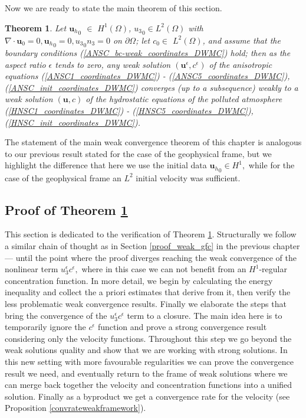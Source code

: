\documentclass[12pt]{report}
\newtheorem{theorem}{Theorem}
\numberwithin{theorem}{chapter}
\numberwithin{corollary}{chapter}
\numberwithin{lemma}{chapter}
\numberwithin{remark}{chapter}
\numberwithin{definition}{chapter}
\numberwithin{prop}{chapter}
\begin{document}
Now we are ready to state the main theorem of this section.

\begin{theorem} \label{maintheoremWEAK}
Let ${\mathbf{u}_h}_0$ $\in$ $H^1 (\Omega)$, ${u_3}_0 \in L^2(\Omega)$ with $\nabla \cdot \mathbf{u}_0 = 0, {\mathbf{u}_h}_0 = 0, {u_3}_0 n_3 = 0$ on $\partial \Omega$; let $c_0 \in$ $L^2 (\Omega)$, and assume that the boundary conditions (\ref{ANSC_bc-weak_coordinates_DWMC}) hold; then as the aspect ratio $\epsilon$ tends to zero, any weak solution $(\mathbf{u}^\epsilon, c^\epsilon)$ of the anisotropic equations (\ref{ANSC1_coordinates_DWMC}) - (\ref{ANSC5_coordinates_DWMC}), (\ref{ANSC_init_coordinates_DWMC}) converges (up to a subsequence) weakly to a weak solution $(\mathbf{u}, c)$ of the hydrostatic equations of the polluted atmosphere (\ref{HNSC1_coordinates_DWMC}) - (\ref{HNSC5_coordinates_DWMC}), (\ref{HNSC_init_coordinates_DWMC}).
\end{theorem}

The statement of the main weak convergence theorem of this chapter is analogous to our previous result stated for the case of the geophysical frame, but we highlight the difference that here we use the initial data ${\mathbf{u}_h}_0 \in H^1,$ while for the case of the geophysical frame an $L^2$ initial velocity was sufficient.
  
\subsection{Proof of Theorem \ref{maintheoremWEAK}} \label{proof_weak_dwmc}

This section is dedicated to the verification of Theorem \ref{maintheoremWEAK}. Structurally we follow a similar chain of thought as in Section \ref{proof_weak_gfc} in the previous chapter --- until the point where the proof diverges reaching the weak convergence of the nonlinear term $u_3^\epsilon c^\epsilon,$ where in this case we can not benefit from an $H^1$-regular concentration function. In more detail, we begin by calculating the energy inequality and collect the a priori estimates that derive from it, then verify the less problematic weak convergence results. Finally we elaborate the steps that bring the convergence of the $u_3^\epsilon c^\epsilon$ term to a closure. The main idea here is to temporarily ignore the $c^\epsilon$ function and prove a strong convergence result considering only the velocity functions. Throughout this step we go beyond the weak solutions quality and show that we are working with strong solutions. In this new setting with more favourable regularities we can prove the convergence result we need, and eventually return to the frame of weak solutions where we can merge back together the velocity and concentration functions into a unified solution. Finally as a byproduct we get a convergence rate for the velocity (see Proposition \ref{convrateweakframework}).
\end{document}
